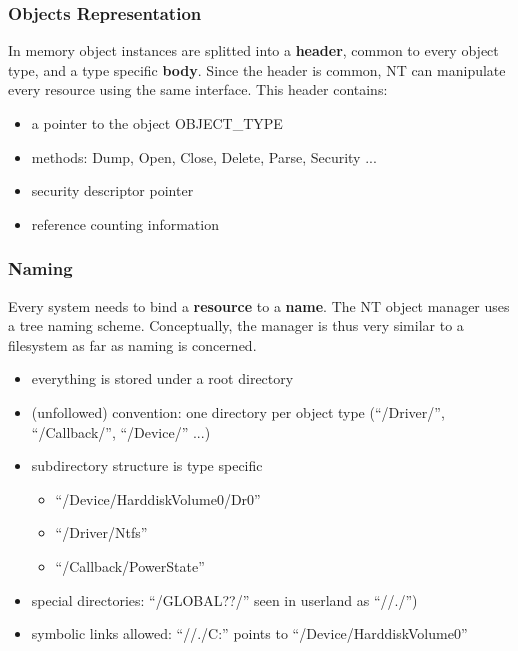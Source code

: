 \begin{frame}
  \frametitle{Objects Representation}

  In memory object instances are splitted into a \textbf{header}, common to every
  object type, and a type specific \textbf{body}. Since the header is common,
  NT can manipulate every resource using the same interface. This header contains:

  \begin{itemize}
    \item
      a pointer to the object OBJECT\_TYPE
    \item
      methods: Dump, Open, Close, Delete, Parse, Security ...
    \item
      security descriptor pointer
    \item
      reference counting information 
  \end{itemize}
\end{frame}


\begin{frame}
  \frametitle{Naming}

  Every system needs to bind a \textbf{resource} to a \textbf{name}. The NT object
  manager uses a tree naming scheme. Conceptually, the manager is thus very similar
  to a filesystem as far as naming is concerned.

  \begin{itemize}
    \item
      everything is stored  under a root directory
    \item
      (unfollowed) convention: one directory per object type (``/Driver/'', ``/Callback/'', ``/Device/'' ...)
    \item
      subdirectory structure is type specific

      \begin{itemize}
        \item
          ``/Device/HarddiskVolume0/Dr0''
        \item
          ``/Driver/Ntfs''
        \item
          ``/Callback/PowerState''
      \end{itemize}

    \item
      special directories: ``/GLOBAL??/'' seen in userland as ``//./'')
    \item
      symbolic links allowed: ``//./C:'' points to ``/Device/HarddiskVolume0''
  \end{itemize}

\end{frame}



